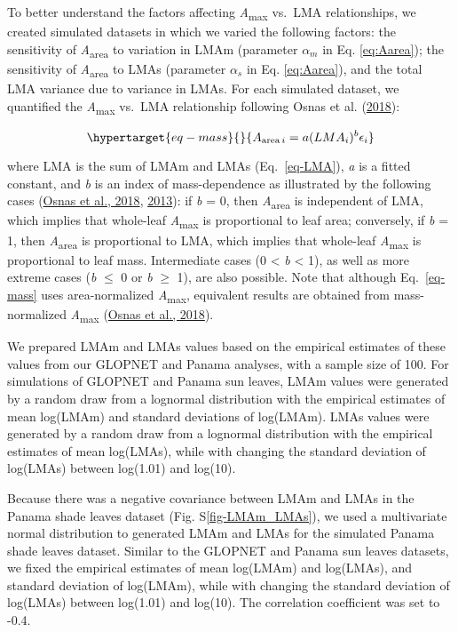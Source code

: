 \documentclass[
  12pt,
  a4paper,
,tablecaptionabove
]{scrartcl}
\begin{document}
To better understand the factors affecting \emph{A}\textsubscript{max}
vs.~LMA relationships, we created simulated datasets in which we varied
the following factors: the sensitivity of \emph{A}\textsubscript{area}
to variation in LMAm (parameter \(\alpha_m\) in Eq. \ref{eq:Aarea}); the
sensitivity of \emph{A}\textsubscript{area} to LMAs (parameter
\(\alpha_s\) in Eq. \ref{eq:Aarea}), and the total LMA variance due to
variance in LMAs. For each simulated dataset, we quantified the
\emph{A}\textsubscript{max} vs.~LMA relationship following Osnas et al.
(\protect\hyperlink{ref-Osnas2018}{2018}):

\begin{equation}\protect\hypertarget{eq-mass}{}{
A_{\mathrm{area} \, i} = a (LMA_i)^{b}\epsilon_i
}\label{eq-mass}\end{equation}

where LMA is the sum of LMAm and LMAs (Eq.~\ref{eq-LMA}), \emph{a} is a
fitted constant, and \emph{b} is an index of mass-dependence as
illustrated by the following cases
(\protect\hyperlink{ref-Osnas2018}{Osnas et al., 2018},
\protect\hyperlink{ref-Osnas2013}{2013}): if \emph{b} = 0, then
\emph{A}\textsubscript{area} is independent of LMA, which implies that
whole-leaf \emph{A}\textsubscript{max} is proportional to leaf area;
conversely, if \emph{b} = 1, then \emph{A}\textsubscript{area} is
proportional to LMA, which implies that whole-leaf
\emph{A}\textsubscript{max} is proportional to leaf mass. Intermediate
cases (0 \textless{} \emph{b} \textless{} 1), as well as more extreme
cases (\emph{b} \(\leq\) 0 or \emph{b} \(\geq\) 1), are also possible.
Note that although Eq.~\ref{eq-mass} uses area-normalized
\emph{A}\textsubscript{max}, equivalent results are obtained from
mass-normalized \emph{A}\textsubscript{max}
(\protect\hyperlink{ref-Osnas2018}{Osnas et al., 2018}).

We prepared LMAm and LMAs values based on the empirical estimates of
these values from our GLOPNET and Panama analyses, with a sample size of
100. For simulations of GLOPNET and Panama sun leaves, LMAm values were
generated by a random draw from a lognormal distribution with the
empirical estimates of mean log(LMAm) and standard deviations of
log(LMAm). LMAs values were generated by a random draw from a lognormal
distribution with the empirical estimates of mean log(LMAs), while with
changing the standard deviation of log(LMAs) between log(1.01) and
log(10).

Because there was a negative covariance between LMAm and LMAs in the
Panama shade leaves dataset (Fig. S\ref{fig-LMAm_LMAs}), we used a
multivariate normal distribution to generated LMAm and LMAs for the
simulated Panama shade leaves dataset. Similar to the GLOPNET and Panama
sun leaves datasets, we fixed the empirical estimates of mean log(LMAm)
and log(LMAs), and standard deviation of log(LMAm), while with changing
the standard deviation of log(LMAs) between log(1.01) and log(10). The
correlation coefficient was set to -0.4.
\end{document}
